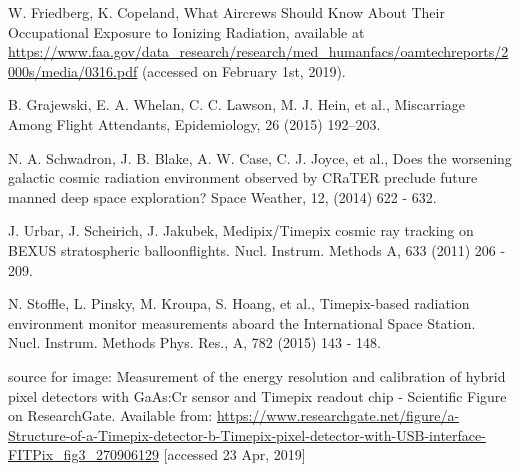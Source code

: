 



\begin{thebibliography}{00}

  W. Friedberg, K. Copeland, What Aircrews Should Know About Their Occupational Exposure to Ionizing Radiation, available at \url{https://www.faa.gov/data_research/research/med_humanfacs/oamtechreports/2000s/media/0316.pdf} (accessed on February 1st, 2019).
  
  B. Grajewski, E. A. Whelan, C. C. Lawson, M. J. Hein, et al., Miscarriage Among Flight Attendants, Epidemiology, 26 (2015) 192–203.

  N. A. Schwadron, J. B. Blake, A. W. Case, C. J. Joyce, et al., Does the worsening galactic cosmic radiation environment observed by CRaTER preclude future manned deep space exploration? Space Weather, 12, (2014) 622 - 632.

  J. Urbar, J. Scheirich, J. Jakubek, Medipix/Timepix cosmic ray tracking on BEXUS stratospheric balloonflights. Nucl. Instrum. Methods A, 633 (2011) 206 - 209.

 N. Stoffle, L. Pinsky, M. Kroupa, S. Hoang, et al., Timepix-based radiation environment monitor measurements aboard the International Space Station. Nucl. Instrum. Methods Phys. Res., A, 782 (2015) 143 - 148.

 source for image: Measurement of the energy resolution and calibration of hybrid pixel detectors with GaAs:Cr sensor and Timepix readout chip - Scientific Figure on ResearchGate. Available from: \url{https://www.researchgate.net/figure/a-Structure-of-a-Timepix-detector-b-Timepix-pixel-detector-with-USB-interface-FITPix_fig3_270906129} [accessed 23 Apr, 2019]


\end{thebibliography}
